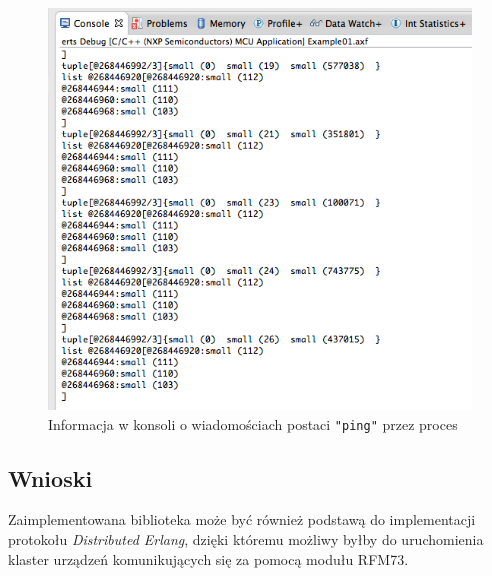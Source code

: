 \begin{figure}[h]
\centerline{\includegraphics[scale=0.7]{console_rfm}}
\caption{Informacja w konsoli o wiadomościach postaci \texttt{"ping"} przez proces}
\label{fig:consolerfm}
\end{figure}


\subsection{Wnioski}

Zaimplementowana biblioteka może być również podstawą do implementacji protokołu \emph{Distributed Erlang}, dzięki któremu możliwy byłby do uruchomienia klaster urządzeń komunikujących się za pomocą modułu RFM73.
